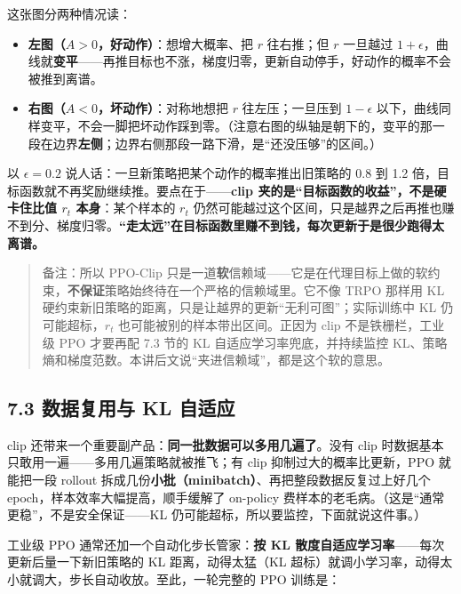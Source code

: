 \documentclass[
  chinese,
]{ctexart}
\providecommand{\tightlist}{%
  \setlength{\itemsep}{0pt}\setlength{\parskip}{0pt}}
\begin{document}
这张图分两种情况读：

\begin{itemize}
\tightlist
\item
  \textbf{左图（\(A>0\)，好动作）}：想增大概率、把 \(r\) 往右推；但
  \(r\) 一旦越过
  \(1+\epsilon\)，曲线就\textbf{变平}------再推目标也不涨，梯度归零，更新自动停手，好动作的概率不会被推到离谱。
\item
  \textbf{右图（\(A<0\)，坏动作）}：对称地想把 \(r\) 往左压；一旦压到
  \(1-\epsilon\)
  以下，曲线同样变平，不会一脚把坏动作踩到零。（注意右图的纵轴是朝下的，变平的那一段在边界\textbf{左侧}；边界右侧那段一路下滑，是``还没压够''的区间。）
\end{itemize}

以 \(\epsilon=0.2\) 说人话：一旦新策略把某个动作的概率推出旧策略的 0.8
到 1.2 倍，目标函数就不再奖励继续推。要点在于------\textbf{clip
夹的是``目标函数的收益''，不是硬卡住比值 \(r_t\) 本身}：某个样本的
\(r_t\)
仍然可能越过这个区间，只是越界之后再推也赚不到分、梯度归零。\textbf{``走太远''在目标函数里赚不到钱，每次更新于是很少跑得太离谱。}

\begin{quote}
备注：所以 PPO-Clip
只是一道\textbf{软}信赖域------它是在代理目标上做的软约束，\textbf{不保证}策略始终待在一个严格的信赖域里。它不像
TRPO 那样用 KL
硬约束新旧策略的距离，只是让越界的更新``无利可图''；实际训练中 KL
仍可能超标，\(r_t\) 也可能被别的样本带出区间。正因为 clip
不是铁栅栏，工业级 PPO 才要再配 7.3 节的 KL 自适应学习率兜底，并持续监控
KL、策略熵和梯度范数。本讲后文说``夹进信赖域''，都是这个软的意思。
\end{quote}

\subsection{7.3 数据复用与 KL
自适应}\label{ux6570ux636eux590dux7528ux4e0e-kl-ux81eaux9002ux5e94}

clip 还带来一个重要副产品：\textbf{同一批数据可以多用几遍了}。没有 clip
时数据基本只敢用一遍------多用几遍策略就被推飞；有 clip
抑制过大的概率比更新，PPO 就能把一段 rollout
拆成几份\textbf{小批（minibatch）}、再把整段数据反复过上好几个
epoch，样本效率大幅提高，顺手缓解了 on-policy
费样本的老毛病。（这是``通常更稳''，不是安全保证------KL
仍可能超标，所以要监控，下面就说这件事。）

工业级 PPO 通常还加一个自动化步长管家：\textbf{按 KL
散度自适应学习率}------每次更新后量一下新旧策略的 KL 距离，动得太猛（KL
超标）就调小学习率，动得太小就调大，步长自动收放。至此，一轮完整的 PPO
训练是：
\end{document}
